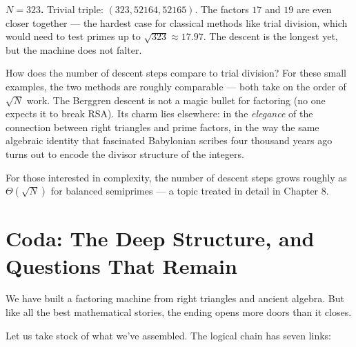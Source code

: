 \documentclass[11pt,twoside,openright]{book}
\theoremstyle{definition}
\theoremstyle{remark}
\begin{document}
\textbf{$N = 323$.}
Trivial triple: $(323, 52164, 52165)$. The factors $17$ and $19$ are even closer together --- the hardest case for classical methods like trial division, which would need to test primes up to $\sqrt{323} \approx 17.97$. The descent is the longest yet, but the machine does not falter.

How does the number of descent steps compare to trial division? For these small examples, the two methods are roughly comparable --- both take on the order of $\sqrt{N}$ work. The Berggren descent is not a magic bullet for factoring (no one expects it to break RSA). Its charm lies elsewhere: in the \textit{elegance} of the connection between right triangles and prime factors, in the way the same algebraic identity that fascinated Babylonian scribes four thousand years ago turns out to encode the divisor structure of the integers.

For those interested in complexity, the number of descent steps grows roughly as $\Theta(\sqrt{N})$ for balanced semiprimes --- a topic treated in detail in Chapter 8.




\section{Coda: The Deep Structure, and Questions That Remain}

We have built a factoring machine from right triangles and ancient algebra. But like all the best mathematical stories, the ending opens more doors than it closes.

Let us take stock of what we've assembled. The logical chain has seven links:
\end{document}
